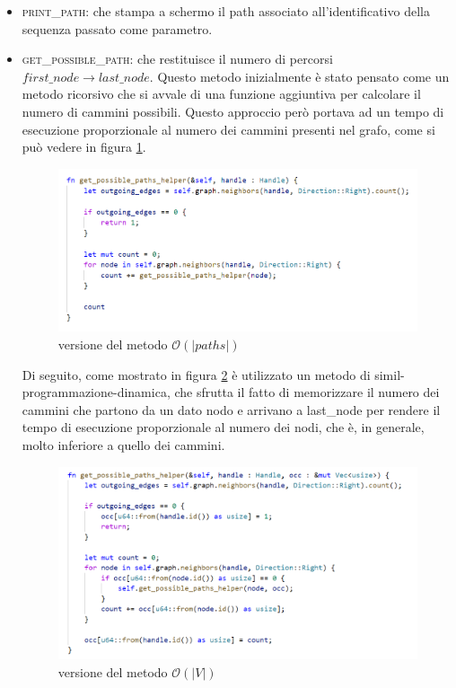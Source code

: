 \begin{itemize}
    \item \textsc{print\_path}: che stampa a schermo il path associato all'identificativo della sequenza passato come parametro.
    
    \item \textsc{get\_possible\_path}: che restituisce il numero di percorsi \newline $first\_node \to last\_node$. Questo metodo inizialmente è stato pensato come un metodo ricorsivo che si avvale di una funzione aggiuntiva per calcolare il numero di cammini possibili. Questo approccio però portava ad un tempo di esecuzione proporzionale al numero dei cammini presenti nel grafo, come si può vedere in figura \ref{fig:slow_get_path_num}.
    
    \begin{figure}[ht]
        \centering
        \includegraphics[scale=0.6]{images/slow_path_count.PNG}
        \caption{versione del metodo $\mathcal{O}(|paths|)$}
        \label{fig:slow_get_path_num}
    \end{figure}
   
    Di seguito, come mostrato in figura \ref{fig:fast_get_path_num} è utilizzato un metodo di simil-programmazione-dinamica, che sfrutta il fatto di memorizzare il numero dei cammini che partono da un dato nodo e arrivano a last\_node per rendere il tempo di esecuzione proporzionale al numero dei nodi, che è, in generale, molto inferiore a quello dei cammini.
    
    \begin{figure}[ht]
        \centering
        \includegraphics[scale=0.6]{images/fast_path_count.PNG}
        \caption{versione del metodo $\mathcal{O}(|V|)$}
        \label{fig:fast_get_path_num}
    \end{figure}
    

\end{itemize}
